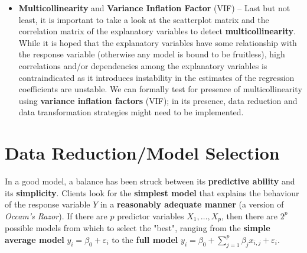 \begin{itemize}
\item \textbf{Multicollinearity} and \textbf{Variance Inflation Factor} (VIF) -- Last but not least, it is important to take a look at the scatterplot matrix and the correlation matrix of the explanatory variables to detect \textbf{multicollinearity}. While it is hoped that the explanatory variables have some relationship with the response variable (otherwise any model is bound to be fruitless), high correlations and/or dependencies among the explanatory variables is contraindicated as it introduces instability in the estimates of the regression coefficients are unstable. We can formally test for presence of multicollinearity using \textbf{variance inflation factors} (VIF); in its presence, data reduction and data transformation strategies might need to be implemented. 
\end{itemize}



\section{Data Reduction/Model Selection} \label{sec:Data.Red}
In a good model, a balance has been struck between its \textbf{predictive ability} and its \textbf{simplicity}. Clients look for the \textbf{simplest model} that explains the behaviour of the response variable $Y$ in a \textbf{reasonably adequate manner} (a version of \textit{Occam's Razor}). If there are $p$ predictor variables $X_1,\ldots,X_p$, then there are $2^{p}$ possible models from which to select the "best", ranging from the \textbf{simple average model} ${y}_{i}=\beta_{0}+\varepsilon_{i}$ to the \textbf{full model} ${y}_{i}=\beta_{0}+\sum_{j=1}^{p}\beta_{j}x_{i,j}+\varepsilon_{i}$.

